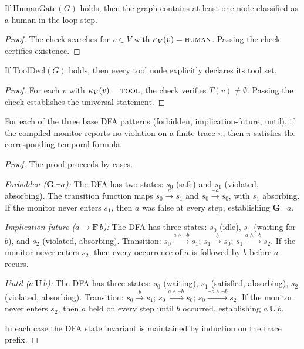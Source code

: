 \begin{lemma}
\label{lem:human_gate}
If $\mathrm{HumanGate}(G)$ holds, then the graph contains at least one
node classified as a human-in-the-loop step.
\end{lemma}
\begin{proof}
The check searches for $v \in V$ with $\kappa_V(v) = \textsc{human}$.
Passing the check certifies existence.
\end{proof}

\begin{lemma}
\label{lem:tool_decl}
If $\mathrm{ToolDecl}(G)$ holds, then every tool node explicitly
declares its tool set.
\end{lemma}
\begin{proof}
For each $v$ with $\kappa_V(v) = \textsc{tool}$, the check verifies
$T(v) \neq \emptyset$. Passing the check establishes the universal
statement.
\end{proof}

\begin{lemma}
\label{lem:monitor}
For each of the three base DFA patterns (forbidden, implication-future,
until), if the compiled monitor reports no violation on a finite trace
$\pi$, then $\pi$ satisfies the corresponding temporal formula.
\end{lemma}
\begin{proof}
The proof proceeds by cases.

\emph{Forbidden ($\mathbf{G}\,\neg a$):} The DFA has two states:
$s_0$ (safe) and $s_1$ (violated, absorbing). The transition
function maps $s_0 \xrightarrow{a} s_1$ and
$s_0 \xrightarrow{\neg a} s_0$, with $s_1$ absorbing.
If the monitor never enters $s_1$, then $a$ was false at every step,
establishing $\mathbf{G}\,\neg a$.

\emph{Implication-future ($a \to \mathbf{F}\,b$):} The DFA has three
states: $s_0$ (idle), $s_1$ (waiting for $b$), and $s_2$ (violated,
absorbing). Transition: $s_0 \xrightarrow{a \wedge \neg b} s_1$;
$s_1 \xrightarrow{b} s_0$; $s_1 \xrightarrow{a \wedge \neg b} s_2$.
If the monitor never enters $s_2$, then every occurrence of $a$ is
followed by $b$ before $a$ recurs.

\emph{Until ($a\,\mathbf{U}\,b$):} The DFA has three states: $s_0$
(waiting), $s_1$ (satisfied, absorbing), $s_2$ (violated, absorbing).
Transition: $s_0 \xrightarrow{b} s_1$;
$s_0 \xrightarrow{a \wedge \neg b} s_0$;
$s_0 \xrightarrow{\neg a \wedge \neg b} s_2$.
If the monitor never enters $s_2$, then $a$ held on every step until
$b$ occurred, establishing $a\,\mathbf{U}\,b$.

In each case the DFA state invariant is maintained by induction on
the trace prefix.
\end{proof}
